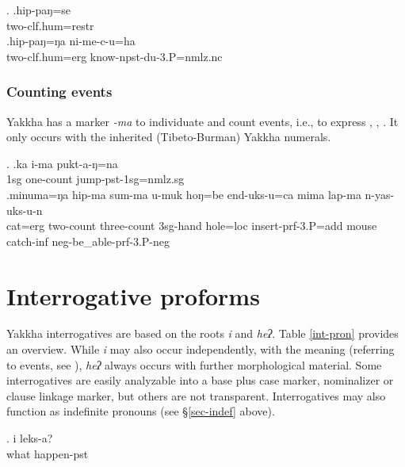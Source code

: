 \ex. \ag.hip-paŋ=se\\
two{\sc -clf.hum=restr}\\
 
\bg.hip-paŋ=ŋa       ni-me-c-u=ha\\
two{\sc -clf.hum=erg} know{\sc -npst-du-3.P=nmlz.nc}\\
 
			
\subsubsection{Counting events}

Yakkha has a marker \emph{-ma} to individuate and count events, i.e., to express , , . It only occurs with the inherited (Tibeto-Burman) Yakkha numerals.

\ex. \ag.ka i-ma pukt-a-ŋ=na \\
{\sc 1sg} one{\sc -count} jump{\sc -pst-1sg=nmlz.sg}\\
\bg.minuma=ŋa   hip-ma     sum-ma       u-muk       hoŋ=be    end-uks-u=ca mima  lap-ma      n-yas-uks-u-n\\
cat{\sc =erg} two{\sc -count} three{\sc -count} {\sc 3sg-}hand hole{\sc =loc} insert{\sc -prf-3.P=add} mouse catch{\sc -inf} {\sc neg-}be\_able{\sc -prf-3.P-neg}\\
 

\section{Interrogative proforms}\label{interr}

Yakkha interrogatives are based on the roots \emph{i} and \emph{heʔ}. Table \ref{int-pron} provides an overview. While \emph{i} may also occur independently, with the meaning  (referring to events, see \Next),  \emph{heʔ} always occurs with further morphological material. Some interrogatives are easily analyzable into a base plus case marker, nominalizer or clause linkage marker, but others are not transparent. Interrogatives may also function as indefinite pronouns (see §\ref{sec-indef} above).

	\exg. i leks-a?\\
		what	happen{\sc [3sg]-pst}\\


